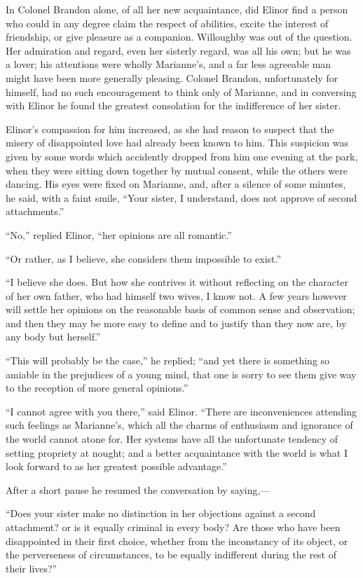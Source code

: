 \documentclass{article}
\begin{document}
In Colonel Brandon alone, of all her new acquaintance,
did Elinor find a person who could in any degree claim the
respect of abilities, excite the interest of friendship,
or give pleasure as a companion.  Willoughby was out
of the question.  Her admiration and regard, even her
sisterly regard, was all his own; but he was a lover;
his attentions were wholly Marianne's, and a far less
agreeable man might have been more generally pleasing.
Colonel Brandon, unfortunately for himself, had no such
encouragement to think only of Marianne, and in conversing
with Elinor he found the greatest consolation for the
indifference of her sister.

Elinor's compassion for him increased, as she had reason
to suspect that the misery of disappointed love had already
been known to him.  This suspicion was given by some words
which accidently dropped from him one evening at the park,
when they were sitting down together by mutual consent,
while the others were dancing.  His eyes were fixed
on Marianne, and, after a silence of some minutes,
he said, with a faint smile, ``Your sister, I understand,
does not approve of second attachments.''

``No,'' replied Elinor, ``her opinions are all romantic.''

``Or rather, as I believe, she considers them
impossible to exist.''

``I believe she does.  But how she contrives it
without reflecting on the character of her own father,
who had himself two wives, I know not.  A few years
however will settle her opinions on the reasonable basis
of common sense and observation; and then they may be
more easy to define and to justify than they now are,
by any body but herself.''

``This will probably be the case,'' he replied;
``and yet there is something so amiable in the prejudices
of a young mind, that one is sorry to see them give way
to the reception of more general opinions.''

``I cannot agree with you there,'' said Elinor.
``There are inconveniences attending such feelings
as Marianne's, which all the charms of enthusiasm and
ignorance of the world cannot atone for.  Her systems have
all the unfortunate tendency of setting propriety at nought;
and a better acquaintance with the world is what I look
forward to as her greatest possible advantage.''

After a short pause he resumed the conversation
by saying,---%

``Does your sister make no distinction in her objections
against a second attachment? or is it equally criminal
in every body?  Are those who have been disappointed
in their first choice, whether from the inconstancy
of its object, or the perverseness of circumstances,
to be equally indifferent during the rest of their lives?''
\end{document}
